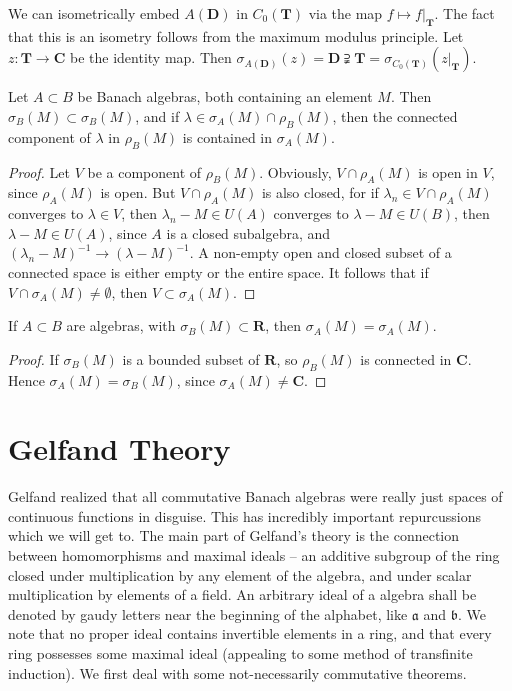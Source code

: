 \begin{example}
    We can isometrically embed $A(\mathbf{D})$ in $C_0(\mathbf{T})$ via the map $f \mapsto f|_\mathbf{T}$. The fact that this is an isometry follows from the maximum modulus principle. Let $z: \mathbf{T} \to \mathbf{C}$ be the identity map. Then $\sigma_{A(\mathbf{D})}(z) = \mathbf{D} \supsetneqq \mathbf{T} = \sigma_{C_0(\mathbf{T})}(z|_\mathbf{T})$.
\end{example}

\begin{theorem}
    Let $A \subset B$ be Banach algebras, both containing an element $M$. Then $\sigma_B(M) \subset \sigma_B(M)$, and if $\lambda \in \sigma_A(M) \cap \rho_B(M)$, then the connected component of $\lambda$ in $\rho_B(M)$ is contained in $\sigma_A(M)$.
\end{theorem}
\begin{proof}
    Let $V$ be a component of $\rho_B(M)$. Obviously, $V \cap \rho_A(M)$ is open in $V$, since $\rho_A(M)$ is open. But $V \cap \rho_A(M)$ is also closed, for if $\lambda_n \in V \cap \rho_A(M)$ converges to $\lambda \in V$, then $\lambda_n - M \in U(A)$ converges to $\lambda - M \in U(B)$, then $\lambda - M \in U(A)$, since $A$ is a closed subalgebra, and $(\lambda_n - M)^{-1} \to (\lambda - M)^{-1}$. A non-empty open and closed subset of a connected space is either empty or the entire space. It follows that if $V \cap \sigma_A(M) \neq \emptyset$, then $V \subset \sigma_A(M)$.
\end{proof}

\begin{corollary}
    If $A \subset B$ are algebras, with $\sigma_B(M) \subset \mathbf{R}$, then $\sigma_A(M) = \sigma_A(M)$.
\end{corollary}
\begin{proof}
    If $\sigma_B(M)$ is a bounded subset of $\mathbf{R}$, so $\rho_B(M)$ is connected in $\mathbf{C}$. Hence $\sigma_A(M) = \sigma_B(M)$, since $\sigma_A(M) \neq \mathbf{C}$.
\end{proof}

\section{Gelfand Theory}

Gelfand realized that all commutative Banach algebras were really just spaces of continuous functions in disguise. This has incredibly important repurcussions which we will get to. The main part of Gelfand's theory is the connection between homomorphisms and maximal ideals -- an additive subgroup of the ring closed under multiplication by any element of the algebra, and under scalar multiplication by elements of a field. An arbitrary ideal of a algebra shall be denoted by gaudy letters near the beginning of the alphabet, like $\mathfrak{a}$ and $\mathfrak{b}$. We note that no proper ideal contains invertible elements in a ring, and that every ring possesses some maximal ideal (appealing to some method of transfinite induction). We first deal with some not-necessarily commutative theorems.

